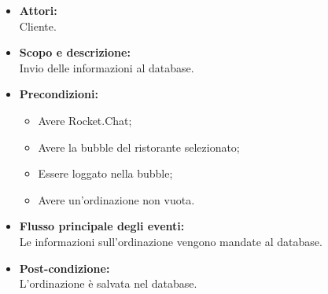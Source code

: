 
\begin{itemize}
	\item \textbf{Attori:}
	\\Cliente.
	\item \textbf{Scopo e descrizione:} 
	\\Invio delle informazioni al database.
	\item \textbf{Precondizioni:}
	\begin{itemize}
		\item Avere Rocket.Chat;
		\item Avere la bubble del ristorante selezionato;
		\item Essere loggato nella bubble;
		\item Avere un'ordinazione non vuota.
	\end{itemize}
	\item \textbf{Flusso principale degli eventi:}
	\\Le informazioni sull'ordinazione vengono mandate al database.
	\item \textbf{Post-condizione:}
	\\L'ordinazione è salvata nel database.
\end{itemize}